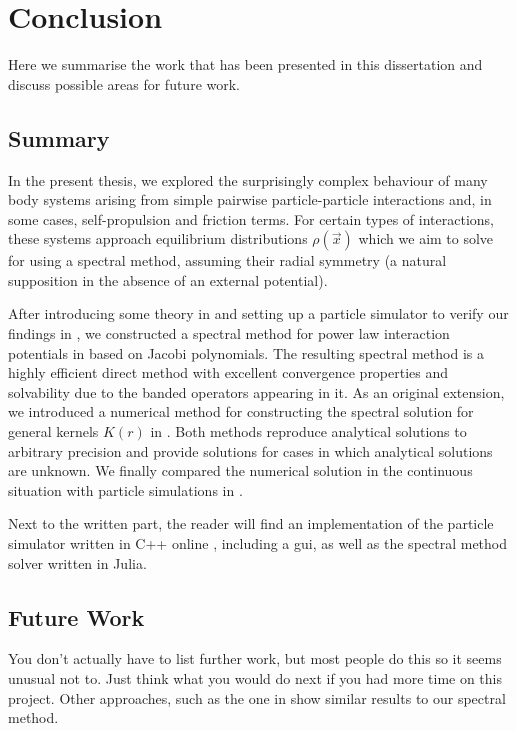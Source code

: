 \chapter{Conclusion}
\label{chap:conclusion}

Here we summarise the work that has been presented in this dissertation and discuss possible areas for future work.

\section{Summary}

In the present thesis, we explored the surprisingly complex behaviour of many body systems arising from simple pairwise particle-particle interactions and, in some cases, self-propulsion and friction terms.
For certain types of interactions, these systems approach equilibrium distributions $\rho(\vec{x})$ which we aim to solve for using a spectral method, assuming their radial symmetry (a natural supposition in the absence of an external potential).

After introducing some theory in  and setting up a particle simulator to verify our findings in , we constructed a spectral method for power law interaction potentials in  based on Jacobi polynomials.
The resulting spectral method is a highly efficient direct method with excellent convergence properties and solvability due to the banded operators appearing in it.
As an original extension, we introduced a numerical method for constructing the spectral solution for general kernels $K(r)$ in .
Both methods reproduce analytical solutions to arbitrary precision and provide solutions for cases in which analytical solutions are unknown.
We finally compared the numerical solution in the continuous situation with particle simulations in .

Next to the written part, the reader will find an implementation of the particle simulator written in C++ online \parencite{2023-my-dissertation}, including a \gls{gui}, as well as the spectral method solver written in Julia.

\section{Future Work}
You don't actually have to list further work, but most people do this so it seems unusual not to. Just think what you would do next if you had more time on this project.
Other approaches, such as the one in \cite{2015-spectral-method-for-boltzmann-equation} show similar results to our spectral method.

